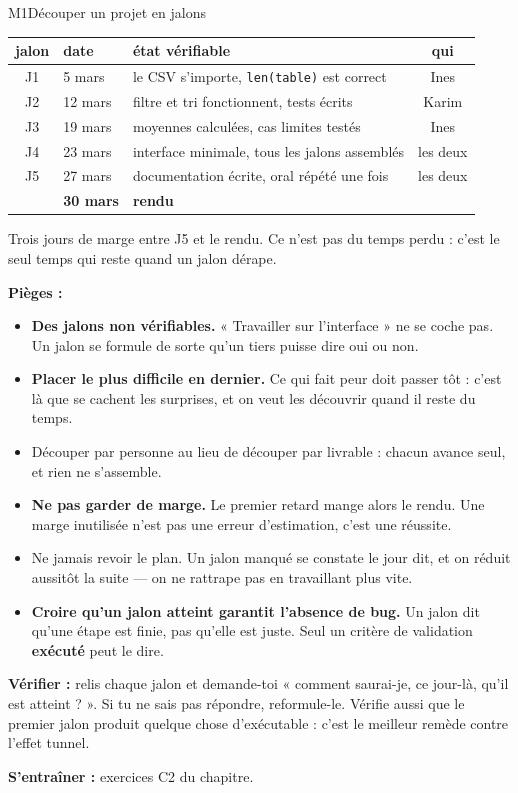 \begin{fichemethode}{M1}{Découper un projet en jalons}
\begin{center}
\begin{tabular}{c|l|l|c}
jalon & date & état vérifiable & qui \\
\hline
J1 & 5 mars & le CSV s'importe, \texttt{len(table)} est correct & Ines \\
J2 & 12 mars & filtre et tri fonctionnent, tests écrits & Karim \\
J3 & 19 mars & moyennes calculées, cas limites testés & Ines \\
J4 & 23 mars & interface minimale, tous les jalons assemblés & les deux \\
J5 & 27 mars & documentation écrite, oral répété une fois & les deux \\
& \textbf{30 mars} & \textbf{rendu} & \\
\end{tabular}
\end{center}

Trois jours de marge entre J5 et le rendu. Ce n'est pas du temps perdu : c'est le seul temps
qui reste quand un jalon dérape.

\textbf{Pièges :}
\begin{itemize}
  \item \textbf{Des jalons non vérifiables.} « Travailler sur l'interface » ne se coche pas.
    Un jalon se formule de sorte qu'un tiers puisse dire oui ou non.
  \item \textbf{Placer le plus difficile en dernier.} Ce qui fait peur doit passer tôt :
    c'est là que se cachent les surprises, et on veut les découvrir quand il reste du temps.
  \item Découper par personne au lieu de découper par livrable : chacun avance seul, et rien
    ne s'assemble.
  \item \textbf{Ne pas garder de marge.} Le premier retard mange alors le rendu. Une marge
    inutilisée n'est pas une erreur d'estimation, c'est une réussite.
  \item Ne jamais revoir le plan. Un jalon manqué se constate le jour dit, et on réduit
    aussitôt la suite — on ne rattrape pas en travaillant plus vite.
  \item \textbf{Croire qu'un jalon atteint garantit l'absence de bug.} Un jalon dit qu'une
    étape est finie, pas qu'elle est juste. Seul un critère de validation \textbf{exécuté}
    peut le dire.
\end{itemize}

\textbf{Vérifier :} relis chaque jalon et demande-toi « comment saurai-je, ce jour-là, qu'il
est atteint ? ». Si tu ne sais pas répondre, reformule-le. Vérifie aussi que le premier
jalon produit quelque chose d'exécutable : c'est le meilleur remède contre l'effet tunnel.

\textbf{S'entraîner :} exercices C2 du chapitre.
\end{fichemethode}
